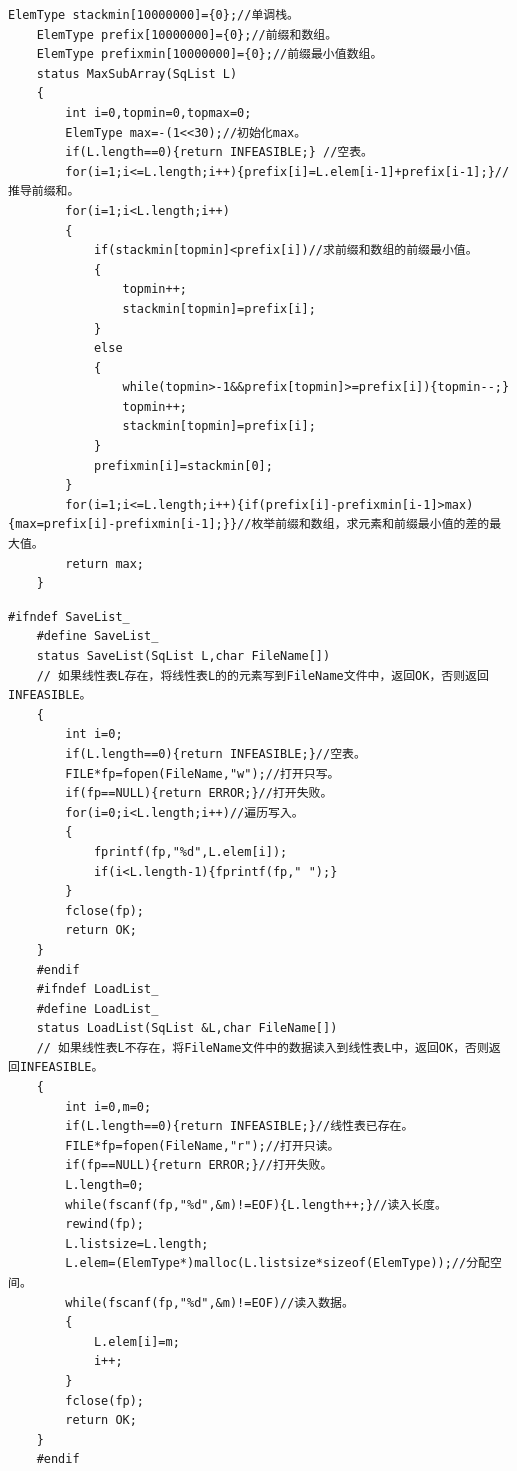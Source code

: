 \documentclass[supercite]{Experimental_Report}
\theoremstyle{definition}
\begin{document}
\begin{lstlisting}[title =最大连续子数组和,frame=none]
	ElemType stackmin[10000000]={0};//单调栈。 
	ElemType prefix[10000000]={0};//前缀和数组。
	ElemType prefixmin[10000000]={0};//前缀最小值数组。
	status MaxSubArray(SqList L)
	{
		int i=0,topmin=0,topmax=0;
		ElemType max=-(1<<30);//初始化max。 
		if(L.length==0){return INFEASIBLE;} //空表。 
		for(i=1;i<=L.length;i++){prefix[i]=L.elem[i-1]+prefix[i-1];}//推导前缀和。 
		for(i=1;i<L.length;i++)
		{
			if(stackmin[topmin]<prefix[i])//求前缀和数组的前缀最小值。
			{
				topmin++;
				stackmin[topmin]=prefix[i];
			}
			else
			{
				while(topmin>-1&&prefix[topmin]>=prefix[i]){topmin--;}
				topmin++;
				stackmin[topmin]=prefix[i];
			}
			prefixmin[i]=stackmin[0];
		}
		for(i=1;i<=L.length;i++){if(prefix[i]-prefixmin[i-1]>max){max=prefix[i]-prefixmin[i-1];}}//枚举前缀和数组，求元素和前缀最小值的差的最大值。 
		return max;
	}
\end{lstlisting}
\begin{lstlisting}[title =文件操作,frame=none]
	#ifndef SaveList_
	#define SaveList_
	status SaveList(SqList L,char FileName[])
	// 如果线性表L存在，将线性表L的的元素写到FileName文件中，返回OK，否则返回INFEASIBLE。
	{
		int i=0;
		if(L.length==0){return INFEASIBLE;}//空表。 
		FILE*fp=fopen(FileName,"w");//打开只写。 
		if(fp==NULL){return ERROR;}//打开失败。 
		for(i=0;i<L.length;i++)//遍历写入。 
		{
			fprintf(fp,"%d",L.elem[i]);
			if(i<L.length-1){fprintf(fp," ");}
		}
		fclose(fp);
		return OK;
	}
	#endif
	#ifndef LoadList_
	#define LoadList_
	status LoadList(SqList &L,char FileName[])
	// 如果线性表L不存在，将FileName文件中的数据读入到线性表L中，返回OK，否则返回INFEASIBLE。
	{
		int i=0,m=0;
		if(L.length==0){return INFEASIBLE;}//线性表已存在。 
		FILE*fp=fopen(FileName,"r");//打开只读。 
		if(fp==NULL){return ERROR;}//打开失败。 
		L.length=0;
		while(fscanf(fp,"%d",&m)!=EOF){L.length++;}//读入长度。 
		rewind(fp);
		L.listsize=L.length;
		L.elem=(ElemType*)malloc(L.listsize*sizeof(ElemType));//分配空间。 
		while(fscanf(fp,"%d",&m)!=EOF)//读入数据。 
		{
			L.elem[i]=m;
			i++;
		}
		fclose(fp);
		return OK;
	}
	#endif
\end{lstlisting}
\end{document}
